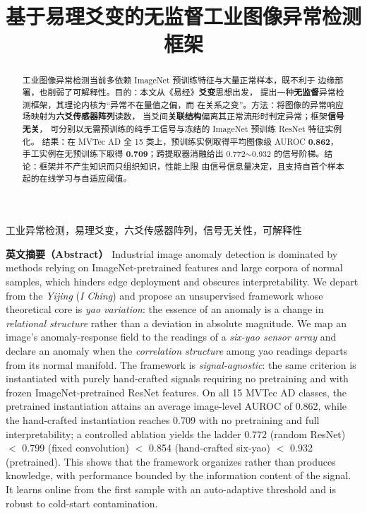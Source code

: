 \documentclass[journal,10pt]{IEEEtran}
\title{基于易理爻变的无监督工业图像异常检测框架}
\author{%
\IEEEauthorblockN{马兴录$^{1}$}
\IEEEauthorblockA{$^{1}$青岛科技大学信息科学技术学院，青岛 266061\\
Email: \texttt{mxl@qust.edu.cn}}}
\begin{document}
\maketitle

\begin{abstract}
工业图像异常检测当前多依赖 ImageNet 预训练特征与大量正常样本，既不利于
边缘部署，也削弱了可解释性。目的：本文从《易经》\textbf{爻变}思想出发，
提出一种\textbf{无监督}异常检测框架，其理论内核为“异常不在量值之偏，而
在关系之变”。方法：将图像的异常响应场映射为\textbf{六爻传感器阵列}读数，
当爻间\textbf{关联结构}偏离其正常流形时判定异常；框架\textbf{信号无关}，
可分别以无需预训练的纯手工信号与冻结的 ImageNet 预训练 ResNet 特征实例化。
结果：在 MVTec AD 全 15 类上，预训练实例取得平均图像级 AUROC
\textbf{0.862}，手工实例在无预训练下取得 \textbf{0.709}；跨提取器消融给出
0.772$\sim$0.932 的信号阶梯。结论：框架并不产生知识而只组织知识，性能上限
由信号信息量决定，且支持自首个样本起的在线学习与自适应阈值。
\end{abstract}

\begin{IEEEkeywords}
工业异常检测，易理爻变，六爻传感器阵列，信号无关性，可解释性
\end{IEEEkeywords}

\noindent\textbf{英文摘要（Abstract）}\quad 
Industrial image anomaly detection is dominated by methods relying on
ImageNet-pretrained features and large corpora of normal samples, which
hinders edge deployment and obscures interpretability. We depart from the
\emph{Yijing} (\emph{I Ching}) and propose an unsupervised framework whose
theoretical core is \emph{yao variation}: the essence of an anomaly is a
change in \emph{relational structure} rather than a deviation in absolute
magnitude. We map an image's anomaly-response field to the readings of a
\emph{six-yao sensor array} and declare an anomaly when the \emph{correlation
structure} among yao readings departs from its normal manifold. The framework
is \emph{signal-agnostic}: the same criterion is instantiated with purely
hand-crafted signals requiring no pretraining and with frozen
ImageNet-pretrained ResNet features. On all 15 MVTec AD classes, the
pretrained instantiation attains an average image-level AUROC of 0.862, while
the hand-crafted instantiation reaches 0.709 with no pretraining and full
interpretability; a controlled ablation yields the ladder 0.772 (random
ResNet) $<$ 0.799 (fixed convolution) $<$ 0.854 (hand-crafted six-yao)
$<$ 0.932 (pretrained). This shows that the framework organizes rather than
produces knowledge, with performance bounded by the information content of the
signal. It learns online from the first sample with an auto-adaptive threshold
and is robust to cold-start contamination.
\end{document}
